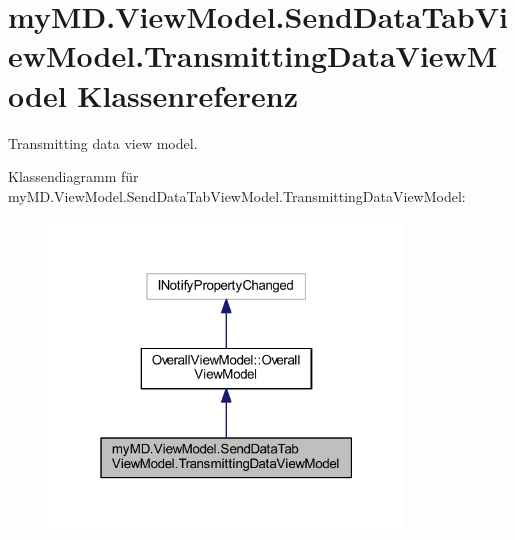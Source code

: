 \hypertarget{classmy_m_d_1_1_view_model_1_1_send_data_tab_view_model_1_1_transmitting_data_view_model}{}\section{my\+M\+D.\+View\+Model.\+Send\+Data\+Tab\+View\+Model.\+Transmitting\+Data\+View\+Model Klassenreferenz}
\label{classmy_m_d_1_1_view_model_1_1_send_data_tab_view_model_1_1_transmitting_data_view_model}


Transmitting data view model.  




Klassendiagramm für my\+M\+D.\+View\+Model.\+Send\+Data\+Tab\+View\+Model.\+Transmitting\+Data\+View\+Model\+:
\nopagebreak
\begin{figure}[H]
\begin{center}
\leavevmode
\includegraphics[width=268pt]{classmy_m_d_1_1_view_model_1_1_send_data_tab_view_model_1_1_transmitting_data_view_model__inherit__graph}
\end{center}
\end{figure}


